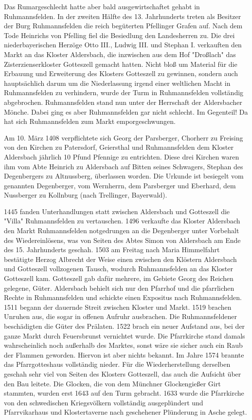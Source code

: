 \documentclass{book}
\begin{document}
Das Rumargeschlecht hatte aber bald ausgewirtschaftet gehabt in Ruhmannsfelden.
In der zweiten Hälfte des 13. Jahrhunderts treten als Besitzer der Burg
Ruhmannsfelden die reich begüterten Pfellinger Grafen auf. Nach dem Tode
Heinrichs von Pfelling fiel die Besiedlung den Landesherren zu. Die drei
niederbayerischen Herzöge Otto III., Ludwig III. und Stephan I. verkauften den
Markt an das Kloster Aldersbach, die inzwischen aus dem Hof "Droßlach" das
Zisterzienserkloster Gotteszell gemacht hatten. Nicht bloß um Material für die
Erbauung und Erweiterung des Klosters Gotteszell zu gewinnen, sondern auch
hauptsächlich darum um die Niederlassung irgend einer weltlichen Macht in
Ruhmannsfelden zu verhindern, wurde der Turm in Ruhmannsfelden vollständig
abgebrochen. Ruhmannsfelden stand nun unter der Herrschaft der Aldersbacher
Mönche. Dabei ging es aber Ruhmannsfelden gar nicht schlecht. Im Gegenteil! Da
hat sich Ruhmannsfelden zum Markt emporgeschwungen.

Am 10. März 1408 verpflichtete sich Georg der Parsberger, Chorherr zu Freising
von den Kirchen zu Patersdorf, Geiersthal und Ruhmannsfelden dem Kloster
Aldersbach jährlich 10 Pfund Pfennige zu entrichten. Diese drei Kirchen waren
ihm vom Abte Heinrich zu Aldersbach auf Bitten seines Schwagers, Stephan des
Degenbergers zu Altnussberg, überlassen worden. Die Urkunde ist besiegelt vom
genannten Degenberger, vom Wernherrn, dem Parsberger und Eberhard, dem
Nussberger zu Kollnburg (nach Trellinger, Bayerwald).

1445 fanden Unterhandlungen statt zwischen Aldersbach und Gotteszell die "Villa"
Ruhmannsfelden zu vertauschen. 1496 verkaufte das Kloster Aldersbach den Markt
Ruhmannsfelden notgedrungen an die Degenberger unter Vorbehalt des
Wiedereinlösens, was von Seiten des Abtes Simon von Aldersbach am Ende des 15.
Jahrhunderts geschah. 1503 am Freitag nach Maria Himmelfahrt bestätigte Herzog
Albrecht der Weise einen zwischen den Klöstern Aldersbach und Gotteszell
vollzogenen Tausch, wodurch Ruhmannsfelden an das Kloster Gotteszell kam.
Gotteszell gab dafür mehrere, im Gebiete Georg des Reichen gelegene, Güter.
Aldersbach behielt sich nur den Pfarrhof und die pfarrlichen Rechte in
Ruhmannsfelden und schickte einen Expositus nach Ruhmannsfelden. 1511 begann der
dauernde Streit zwischen Kloster und Markt. 1519 brachen Unruhen aus, die sogar
in offenen Aufruhr ausbrachen. Die Ruhmannsfeldener beschädigten die Güter des
Prälaten. 1522 brach ein neuer Aufstand aus, bei der ganze Markt durch
Feuersbrunst vernichtet wurde. Die Pfarrkirche stand damals wahrscheinlich noch
außerhalb des Marktes, sonst wäre sie sicher auch ein Raub der Flammen geworden.
Hiervon ist aber nichts bekannt. Im Jahre 1574 brannte das Pfarrgotteshaus
vollständig nieder. Für die Wiederherstellung derselben geschah sehr viel von
Seiten des Klosters Gotteszell, das auch die Aufsicht über den Bau leitete. Die
Glocken, die von dem Münchner Glockengießer Girt stammten, wurden erst 1643 auf
den Turm gebracht. 1633 wurde die Pfarrkirche von den schwedischen Kriegsvölkern
vollständig ausgeplündert und Pfarrvikarhaus und Klostertaverne nach geschehener
Plünderung in Asche gelegt.
\end{document}
